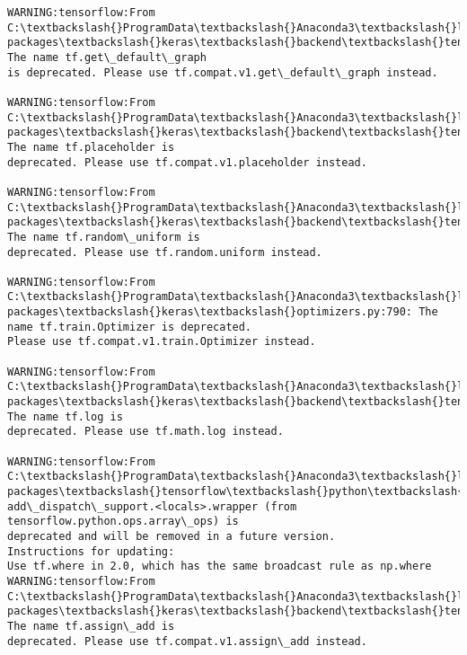 \documentclass[11pt]{article}
\begin{document}
    \begin{Verbatim}[commandchars=\\\{\}]
WARNING:tensorflow:From C:\textbackslash{}ProgramData\textbackslash{}Anaconda3\textbackslash{}lib\textbackslash{}site-
packages\textbackslash{}keras\textbackslash{}backend\textbackslash{}tensorflow\_backend.py:74: The name tf.get\_default\_graph
is deprecated. Please use tf.compat.v1.get\_default\_graph instead.

WARNING:tensorflow:From C:\textbackslash{}ProgramData\textbackslash{}Anaconda3\textbackslash{}lib\textbackslash{}site-
packages\textbackslash{}keras\textbackslash{}backend\textbackslash{}tensorflow\_backend.py:517: The name tf.placeholder is
deprecated. Please use tf.compat.v1.placeholder instead.

WARNING:tensorflow:From C:\textbackslash{}ProgramData\textbackslash{}Anaconda3\textbackslash{}lib\textbackslash{}site-
packages\textbackslash{}keras\textbackslash{}backend\textbackslash{}tensorflow\_backend.py:4138: The name tf.random\_uniform is
deprecated. Please use tf.random.uniform instead.

WARNING:tensorflow:From C:\textbackslash{}ProgramData\textbackslash{}Anaconda3\textbackslash{}lib\textbackslash{}site-
packages\textbackslash{}keras\textbackslash{}optimizers.py:790: The name tf.train.Optimizer is deprecated.
Please use tf.compat.v1.train.Optimizer instead.

WARNING:tensorflow:From C:\textbackslash{}ProgramData\textbackslash{}Anaconda3\textbackslash{}lib\textbackslash{}site-
packages\textbackslash{}keras\textbackslash{}backend\textbackslash{}tensorflow\_backend.py:3376: The name tf.log is
deprecated. Please use tf.math.log instead.

WARNING:tensorflow:From C:\textbackslash{}ProgramData\textbackslash{}Anaconda3\textbackslash{}lib\textbackslash{}site-
packages\textbackslash{}tensorflow\textbackslash{}python\textbackslash{}ops\textbackslash{}nn\_impl.py:180:
add\_dispatch\_support.<locals>.wrapper (from tensorflow.python.ops.array\_ops) is
deprecated and will be removed in a future version.
Instructions for updating:
Use tf.where in 2.0, which has the same broadcast rule as np.where
WARNING:tensorflow:From C:\textbackslash{}ProgramData\textbackslash{}Anaconda3\textbackslash{}lib\textbackslash{}site-
packages\textbackslash{}keras\textbackslash{}backend\textbackslash{}tensorflow\_backend.py:986: The name tf.assign\_add is
deprecated. Please use tf.compat.v1.assign\_add instead.


\end{Verbatim}
\end{document}
